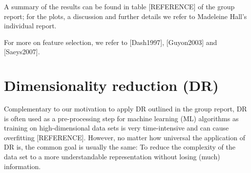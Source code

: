 \documentclass[journal, a4paper]{IEEEtran}
\begin{document}
A summary of the results can be found in table [REFERENCE] of the group report; for the plots, a discussion and further details we refer to Madeleine Hall's individual report.

For more on feature selection, we refer to [Dash1997], [Guyon2003] and [Saeys2007].



\section{Dimensionality reduction (DR)}





Complementary to our motivation to apply DR outlined in the group report, DR is often used as a pre-processing step for machine learning (ML) algorithms as training on high-dimensional data sets is very time-intensive and can cause overfitting [REFERENCE]. However, no matter how universal the application of DR is, the common goal is usually the same: To reduce the complexity of the data set to a more understandable representation without losing (much) information. \\

\end{document}
